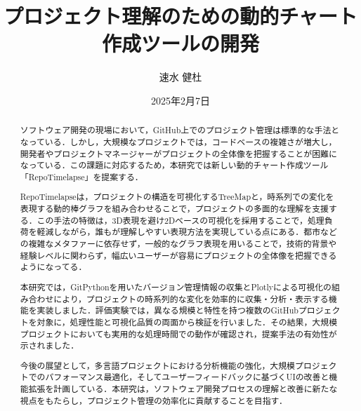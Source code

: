 \documentclass[12pt,twoside]{jbook}
\begin{document}
\title{
プロジェクト理解のための動的チャート作成ツールの開発
}


\author{%
  速水 健杜
}

\date{2025年2月7日}






\maketitle


\begin{abstract}
  ソフトウェア開発の現場において，GitHub上でのプロジェクト管理は標準的な手法となっている．しかし，大規模なプロジェクトでは，コードベースの複雑さが増大し，開発者やプロジェクトマネージャーがプロジェクトの全体像を把握することが困難になっている．この課題に対応するため，本研究では新しい動的チャート作成ツール「RepoTimelapse」を提案する．
  
  RepoTimelapseは，プロジェクトの構造を可視化するTreeMapと，時系列での変化を表現する動的棒グラフを組み合わせることで，プロジェクトの多面的な理解を支援する．この手法の特徴は，3D表現を避け2Dベースの可視化を採用することで，処理負荷を軽減しながら，誰もが理解しやすい表現方法を実現している点にある．都市などの複雑なメタファーに依存せず，一般的なグラフ表現を用いることで，技術的背景や経験レベルに関わらず，幅広いユーザーが容易にプロジェクトの全体像を把握できるようになってる．
  
  本研究では，GitPythonを用いたバージョン管理情報の収集とPlotlyによる可視化の組み合わせにより，プロジェクトの時系列的な変化を効率的に収集・分析・表示する機能を実装しました．評価実験では，異なる規模と特性を持つ複数のGitHubプロジェクトを対象に，処理性能と可視化品質の両面から検証を行いました．その結果，大規模プロジェクトにおいても実用的な処理時間での動作が確認され，提案手法の有効性が示されました．

  今後の展望として，多言語プロジェクトにおける分析機能の強化，大規模プロジェクトでのパフォーマンス最適化，そしてユーザーフィードバックに基づくUIの改善と機能拡張を計画している．本研究は，ソフトウェア開発プロセスの理解と改善に新たな視点をもたらし，プロジェクト管理の効率化に貢献することを目指す．
\end{abstract}
\end{document}
